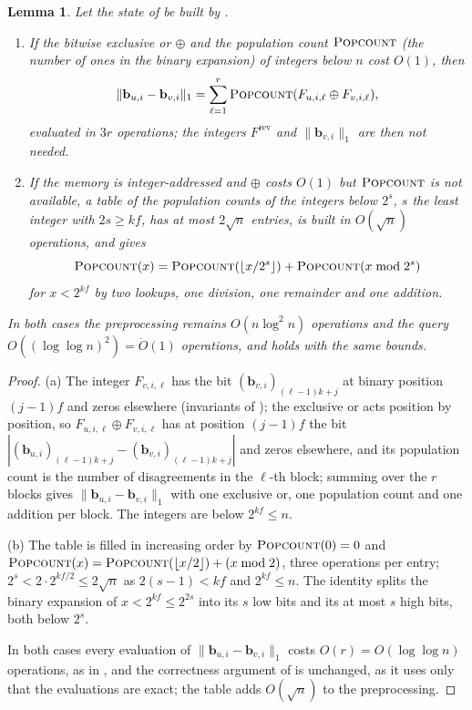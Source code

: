 \documentclass[11pt]{article}
\newtheorem{lemma}[theorem]{Lemma}
\theoremstyle{remark}
\newcommand{\norm}[1]{\lVert#1\rVert}
\newcommand{\Odouble}{\ddot{O}}
\newcommand{\bb}{\mathbf b}
\begin{document}
\begin{lemma}\label{lem:packed-model}
Let the state of  be built by .
\begin{enumerate}[label=(\alph*),leftmargin=*]
\item If the bitwise exclusive or $\oplus$ and the population count
$\textsc{Popcount}$ (the number of ones in the binary expansion) of
integers below $n$ cost $O(1)$, then
\[
\norm{\bb_{u,i}-\bb_{v,i}}_1
=\sum_{\ell=1}^{r}\textsc{Popcount}(F_{u,i,\ell}\oplus F_{v,i,\ell}),
\]
evaluated in $3r$ operations; the integers $F^{\mathrm{rev}}$ and
$\norm{\bb_{v,i}}_1$ are then not needed.
\item If the memory is integer-addressed and $\oplus$ costs $O(1)$ but
$\textsc{Popcount}$ is not available, a table of the population counts of
the integers below $2^{s}$, $s$ the least integer with $2s\ge kf$, has
at most $2\sqrt n$ entries, is built in $O(\sqrt n)$ operations, and gives
\[
\textsc{Popcount}(x)=\textsc{Popcount}(\lfloor x/2^{s}\rfloor)
+\textsc{Popcount}(x\bmod2^{s})
\]
for $x<2^{kf}$ by two lookups, one division, one remainder and one
addition.
\end{enumerate}
In both cases the preprocessing remains $O(n\log^{2}n)$ operations and the
query $O((\log\log n)^{2})=\Odouble(1)$ operations, and  holds
with the same bounds.
\end{lemma}
\begin{proof}
(a) The integer $F_{v,i,\ell}$ has the bit $(\bb_{v,i})_{(\ell-1)k+j}$ at
binary position $(j-1)f$ and zeros elsewhere (invariants of
); the exclusive or acts position by position, so
$F_{u,i,\ell}\oplus F_{v,i,\ell}$ has at position $(j-1)f$ the bit
$|(\bb_{u,i})_{(\ell-1)k+j}-(\bb_{v,i})_{(\ell-1)k+j}|$ and zeros elsewhere,
and its population count is the number of disagreements in the $\ell$-th
block; summing over the $r$ blocks gives $\norm{\bb_{u,i}-\bb_{v,i}}_1$ with
one exclusive or, one population count and one addition per block.
The integers are below $2^{kf}\le n$.

(b) The table is filled in increasing order by
$\textsc{Popcount}(0)=0$ and
$\textsc{Popcount}(x)=\textsc{Popcount}(\lfloor x/2\rfloor)+(x\bmod2)$, three
operations per entry; $2^{s}<2\cdot2^{kf/2}\le2\sqrt n$ as $2(s-1)<kf$ and
$2^{kf}\le n$.
The identity splits the binary expansion of $x<2^{kf}\le2^{2s}$ into its
$s$ low bits and its at most $s$ high bits, both below $2^{s}$.

In both cases every evaluation of $\norm{\bb_{u,i}-\bb_{v,i}}_1$ costs
$O(r)=O(\log\log n)$ operations, as in , and the
correctness argument of  is unchanged, as it uses only
that the evaluations are exact; the table adds $O(\sqrt n)$ to the
preprocessing.
\end{proof}
\end{document}
